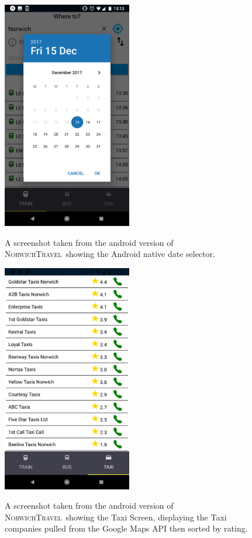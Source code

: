 \documentclass[cmpstyle]{ueacmpstyle}
\newcommand{\nt}{\textsc{NorwichTravel}}
\begin{document}
		\begin{figure}
			\centering
			\includegraphics[height=10cm]{images/android-date.png}\\
			\caption{A screenshot taken from the android version of \nt \ showing the Android native date selector.}\label{fig:android-date}
		\end{figure}
		\begin{figure}[h]
			\centering
			\includegraphics[height=10cm]{images/android-taxi.png}\\
			\caption{A screenshot taken from the android version of \nt \ showing the Taxi Screen, displaying the Taxi companies pulled from the Google Maps API then sorted by rating.}\label{fig:android-taxi}
		\end{figure}
\end{document}
